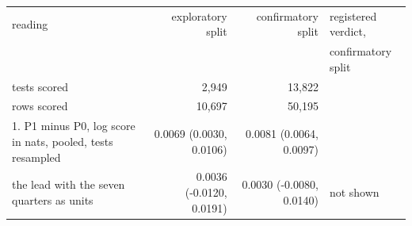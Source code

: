 \begin{tabular}{p{5.6cm}rrp{2.4cm}}
\toprule
reading & exploratory split & confirmatory split & registered verdict, \\
 & & & confirmatory split \\
\midrule
tests scored & 2,949 & 13,822 &  \\
rows scored & 10,697 & 50,195 &  \\
\midrule
1. P1 minus P0, log score in nats, pooled, tests resampled & 0.0069 (0.0030, 0.0106) & 0.0081 (0.0064, 0.0097) &  \\
\quad the lead with the seven quarters as units & 0.0036 (-0.0120, 0.0191) & 0.0030 (-0.0080, 0.0140) & not shown \\

\end{tabular}
